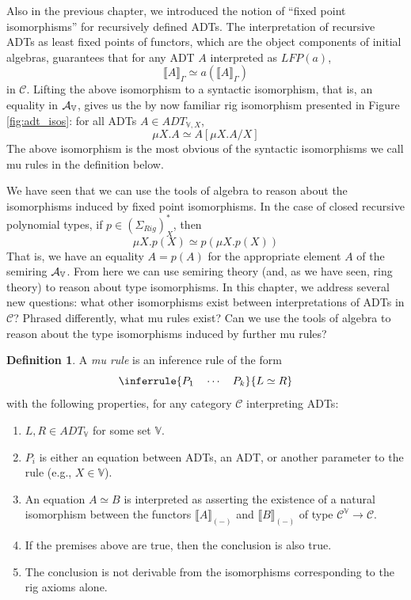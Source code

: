\documentclass{msthesis}
\theoremstyle{definition}
\newtheorem{definition}[theorem]{Definition}
\newcommand{\semof}[1]{\llbracket{#1}\rrbracket}
\newcommand{\mcC}{\mathcal{C}}
\newcommand{\vars}{\mathbb{V}}
\begin{document}
Also in the previous chapter, we introduced the notion of ``fixed point isomorphisms'' for recursively defined ADTs.  The interpretation of recursive ADTs as least fixed points of functors, which are the object components of initial algebras, guarantees that for any ADT $A$ interpreted as $LFP(a)$,
\[ \semof{A}_\Gamma \simeq a(\semof{A}_\Gamma)\]
in $\mcC$.  Lifting the above isomorphism to a syntactic isomorphism, that is, an equality in $\ADTrig$, gives us the by now familiar rig isomorphism presented in Figure \ref{fig:adt_isos}: for all ADTs $A \in ADT_{\vars, X}$,
\[ \mu X.A \simeq A[\mu X.A/X] \]
The above isomorphism is the most obvious of the syntactic isomorphisms we call mu rules in the definition below.

We have seen that we can use the tools of algebra to reason about the isomorphisms induced by fixed point isomorphisms.  In the case of closed recursive polynomial types, if $p \in (\Sigma_{Rig})^*_X$, then
\[ \mu X.p(X) \simeq p(\mu X.p(X)) \]
That is, we have an equality $A = p(A)$ for the appropriate element $A$ of the semiring $\ADTrig$.  From here we can use semiring theory (and, as we have seen, ring theory) to reason about type isomorphisms.  In this chapter, we address several new questions: what other isomorphisms exist between interpretations of ADTs in $\mcC$?  Phrased differently, what mu rules exist?  Can we use the tools of algebra to reason about the type isomorphisms induced by further mu rules?

\begin{definition}
    A \emph{mu rule} is an inference rule of the form 
    \[ \inferrule{P_1 \quad \cdots \quad P_k}{L \simeq R}\]
    with the following properties, for any category $\mcC$ interpreting ADTs:
    \begin{enumerate}[nosep]
        \item $L,R \in ADT_\vars$ for some set $\vars$.
        \item $P_i$ is either an equation between ADTs, an ADT, or another parameter to the rule (e.g., $X \in \vars$).
        \item An equation $A \simeq B$ is interpreted as asserting the existence of a natural isomorphism between the functors $\semof{A}_{(-)}$
        and $\semof{B}_{(-)}$ of type $\mcC^\vars \to \mcC$.
        \item If the premises above are true, then the conclusion is also true.
        \item The conclusion is not derivable from the isomorphisms corresponding to the rig axioms alone.
    \end{enumerate}
\end{definition}
\end{document}
